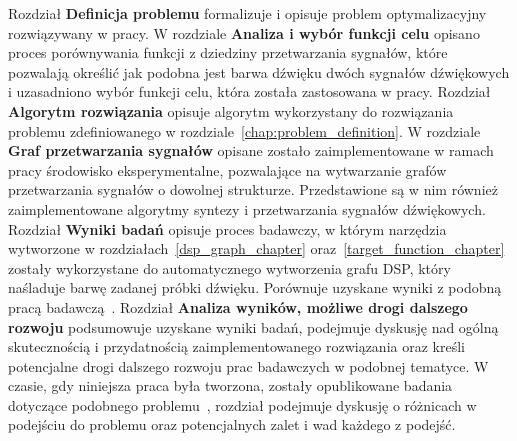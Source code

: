 Rozdział \textbf{Definicja problemu} formalizuje i opisuje problem optymalizacyjny rozwiązywany w pracy.
W rozdziale \textbf{Analiza i wybór funkcji celu} opisano proces porównywania funkcji z dziedziny przetwarzania sygnałów,
które pozwalają określić jak podobna jest barwa dźwięku dwóch sygnałów dźwiękowych i
uzasadniono wybór funkcji celu, która została zastosowana w pracy.
Rozdział \textbf{Algorytm rozwiązania} opisuje algorytm wykorzystany do rozwiązania problemu
zdefiniowanego w rozdziale~\ref{chap:problem_definition}.
W rozdziale \textbf{Graf przetwarzania sygnałów} opisane zostało zaimplementowane w ramach pracy środowisko eksperymentalne,
pozwalające na wytwarzanie grafów przetwarzania sygnałów o dowolnej strukturze.
Przedstawione są w nim również zaimplementowane algorytmy syntezy i przetwarzania sygnałów dźwiękowych.
Rozdział \textbf{Wyniki badań} opisuje proces badawczy, w którym narzędzia wytworzone w
rozdziałach~\ref{dsp_graph_chapter} oraz~\ref{target_function_chapter}
zostały wykorzystane do automatycznego wytworzenia grafu DSP, który naśladuje barwę zadanej próbki dźwięku.
Porównuje uzyskane wyniki z podobną pracą badawczą~\cite{evolutionary_puredata}.
Rozdział \textbf{Analiza wyników, możliwe drogi dalszego rozwoju} podsumowuje uzyskane wyniki badań, podejmuje dyskusję nad ogólną skutecznością i przydatnością zaimplementowanego rozwiązania oraz
kreśli potencjalne drogi dalszego rozwoju prac badawczych w podobnej tematyce. W czasie, gdy niniejsza praca była tworzona, zostały opublikowane badania
dotyczące podobnego problemu~\cite{ieee_synth_programming}, rozdział podejmuje dyskusję o różnicach w podejściu do problemu oraz potencjalnych
zalet i wad każdego z podejść.

